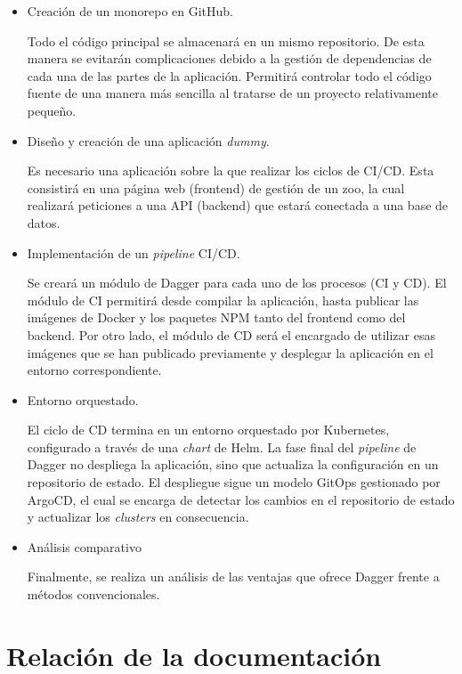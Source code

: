 \begin{itemize}
  \item Creación de un monorepo\cite{monorepo} en GitHub.

    Todo el código principal se almacenará en un mismo repositorio. De esta manera se evitarán complicaciones debido a la gestión de dependencias de cada una de las partes de la aplicación. Permitirá controlar todo el código fuente de una manera más sencilla al tratarse de un proyecto relativamente pequeño.
  \item Diseño y creación de una aplicación \textit{dummy}.

    Es necesario una aplicación sobre la que realizar los ciclos de CI/CD. Esta consistirá en una página web (frontend) de gestión de un zoo, la cual realizará peticiones a una API (backend) que estará conectada a una base de datos.
  \item Implementación de un \textit{pipeline} CI/CD.

    Se creará un módulo de Dagger para cada uno de los procesos (CI y CD). El módulo de CI permitirá desde compilar la aplicación, hasta publicar las imágenes de Docker y los paquetes NPM tanto del frontend como del backend. Por otro lado, el módulo de CD será el encargado de utilizar esas imágenes que se han publicado previamente y desplegar la aplicación en el entorno correspondiente.
  \item Entorno orquestado.

    El ciclo de CD termina en un entorno orquestado por Kubernetes\cite{kubernetes}, configurado a través de una \textit{chart} de Helm\cite{helm}. La fase final del \textit{pipeline} de Dagger no despliega la aplicación, sino que actualiza la configuración en un repositorio de estado. El despliegue sigue un modelo GitOps\cite{gitops} gestionado por ArgoCD\cite{argocd}, el cual se encarga de detectar los cambios en el repositorio de estado y actualizar los \textit{clusters} en consecuencia.

  \item Análisis comparativo

    Finalmente, se realiza un análisis de las ventajas que ofrece Dagger frente a métodos convencionales.
\end{itemize}

\section{Relación de la documentación}

